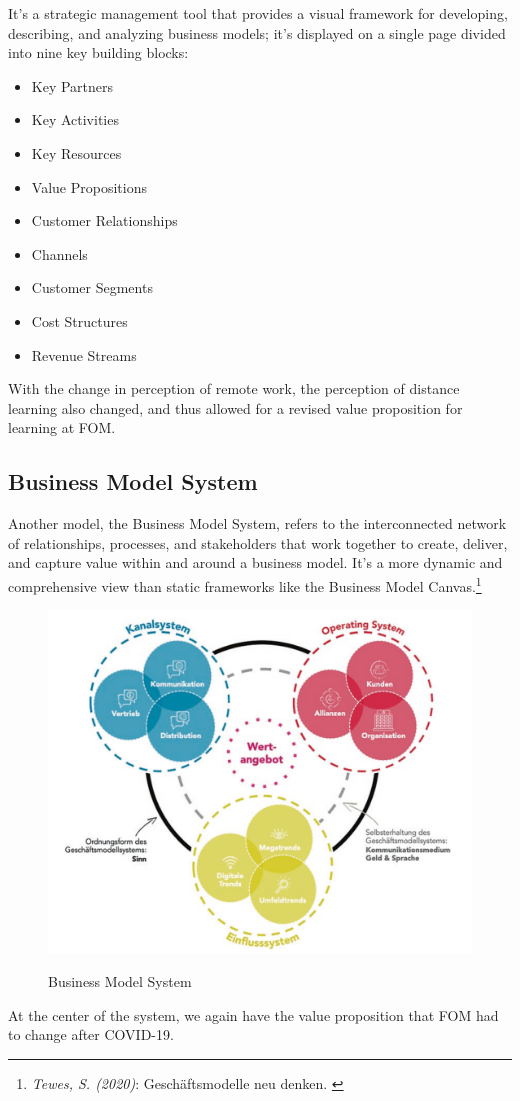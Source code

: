 It's a strategic management tool that provides a visual framework for developing, describing, and analyzing business models; it's displayed on a single page divided into nine key building blocks:

\begin{itemize}
    \item Key Partners
    \item Key Activities
    \item Key Resources
    \item Value Propositions
    \item Customer Relationships
    \item Channels
    \item Customer Segments
    \item Cost Structures
    \item Revenue Streams
\end{itemize}

With the change in perception of remote work, the perception of distance learning also changed, and thus allowed for a revised value proposition for learning at FOM.

\subsection{Business Model System}

Another model, the Business Model System,  refers to the interconnected network of relationships, processes, and stakeholders that work together to create, deliver, and capture value within and around a business model. It's a more dynamic and comprehensive view than static frameworks like the Business Model Canvas.\footnote{\textit{Tewes, S. (2020)}: Geschäftsmodelle neu denken. \cite{zukunft}} 

\begin{figure}[H]
\centering
\caption {Business Model System}
\includegraphics[width=\linewidth]{images/business-model-system.png}
\label{fig:businessModelSystem}
\end{figure}

At the center of the system, we again have the value proposition that FOM had to change after COVID-19.
